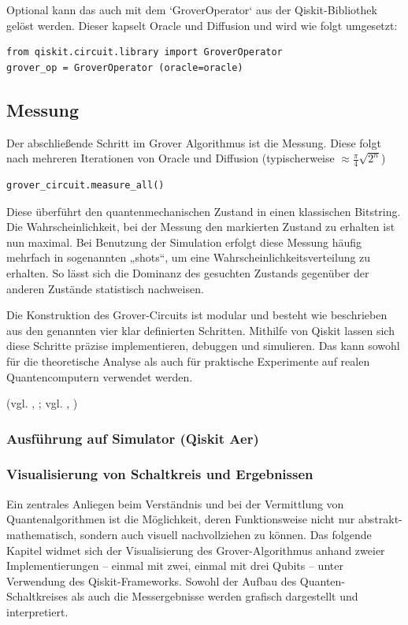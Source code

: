 Optional kann das auch mit dem `GroverOperator` aus der Qiskit-Bibliothek gelöst werden. Dieser kapselt Oracle und Diffusion und wird wie folgt umgesetzt:
\begin{verbatim}
from qiskit.circuit.library import GroverOperator
grover_op = GroverOperator (oracle=oracle)
\end{verbatim}

\subsection*{Messung}
Der abschließende Schritt im Grover Algorithmus ist die Messung. Diese folgt nach mehreren Iterationen von Oracle und Diffusion (typischerweise $\approx \frac{\pi}{4} \sqrt{2^n}$)
\begin{verbatim}
grover_circuit.measure_all()
\end{verbatim}
Diese überführt den quantenmechanischen Zustand in einen klassischen Bitstring. 
Die Wahrscheinlichkeit, bei der Messung den markierten Zustand zu erhalten ist nun maximal. Bei Benutzung der Simulation erfolgt diese Messung häufig mehrfach in sogenannten „shots“, um eine Wahrscheinlichkeitsverteilung zu erhalten. So lässt sich die Dominanz des gesuchten Zustands gegenüber der anderen Zustände statistisch nachweisen.

Die Konstruktion des Grover-Circuits ist modular und besteht wie beschrieben aus den genannten vier klar definierten Schritten. Mithilfe von Qiskit lassen sich diese Schritte präzise implementieren, debuggen und simulieren. Das kann sowohl für die theoretische Analyse als auch für praktische Experimente auf realen Quantencomputern verwendet werden.

(vgl. \citeauthor{ibm_quantum_nodate}, \citeyear{ibm_quantum_nodate}; vgl. \citeauthor{noauthor_grovers_nodate}, \citeyear{noauthor_grovers_nodate})
\subsubsection{Ausführung auf Simulator (Qiskit Aer)}
\subsubsection{Visualisierung von Schaltkreis und Ergebnissen}

\setlength{\parindent}{0pt} %
\setlength{\parskip}{1em}   %

Ein zentrales Anliegen beim Verständnis und bei der Vermittlung von Quantenalgorithmen ist die Möglichkeit, deren Funktionsweise nicht nur abstrakt-mathematisch, sondern auch visuell nachvollziehen zu können. Das folgende Kapitel widmet sich der Visualisierung des Grover-Algorithmus anhand zweier Implementierungen – einmal mit zwei, einmal mit drei Qubits – unter Verwendung des Qiskit-Frameworks. Sowohl der Aufbau des Quanten-Schaltkreises als auch die Messergebnisse werden grafisch dargestellt und interpretiert.

